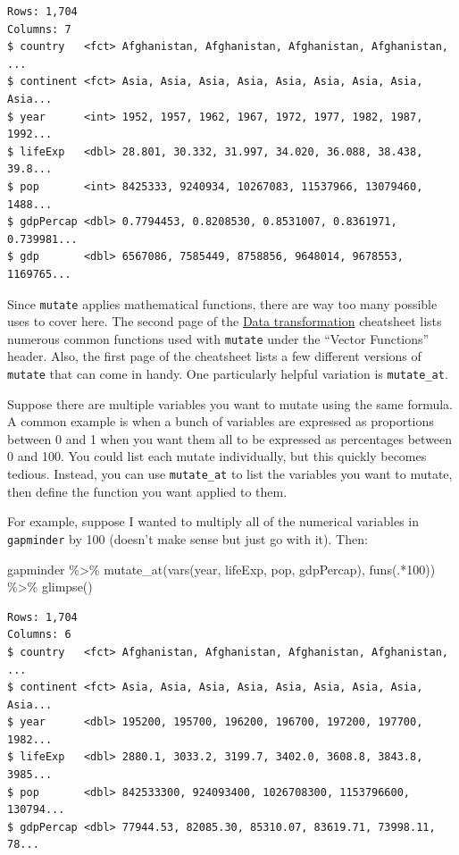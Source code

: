 \documentclass[
]{book}
\makeatletter
\newenvironment{Shaded}{\begin{snugshade}}{\end{snugshade}}
\newcommand{\DecValTok}[1]{\textcolor[rgb]{0.06,0.06,0.06}{#1}}
\newcommand{\FunctionTok}[1]{\textcolor[rgb]{0,0,0}{#1}}
\newcommand{\NormalTok}[1]{#1}
\newcommand{\SpecialCharTok}[1]{\textcolor[rgb]{0,0,0}{#1}}
\newenvironment{kframe}{%
\medskip{}
\setlength{\fboxsep}{.8em}
 \def\at@end@of@kframe{}%
 \ifinner\ifhmode%
  \def\at@end@of@kframe{\end{minipage}}%
  \begin{minipage}{\columnwidth}%
 \fi\fi%
 \def\FrameCommand##1{\hskip\@totalleftmargin \hskip-\fboxsep
 \colorbox{shadecolor}{##1}\hskip-\fboxsep
     \hskip-\linewidth \hskip-\@totalleftmargin \hskip\columnwidth}%
 \MakeFramed {\advance\hsize-\width
   \@totalleftmargin\z@ \linewidth\hsize
   \@setminipage}}%
 {\par\unskip\endMakeFramed%
 \at@end@of@kframe}
\renewenvironment{Shaded}{\begin{kframe}}{\end{kframe}}
\makeatother
\begin{document}
\begin{verbatim}
Rows: 1,704
Columns: 7
$ country   <fct> Afghanistan, Afghanistan, Afghanistan, Afghanistan, ...
$ continent <fct> Asia, Asia, Asia, Asia, Asia, Asia, Asia, Asia, Asia...
$ year      <int> 1952, 1957, 1962, 1967, 1972, 1977, 1982, 1987, 1992...
$ lifeExp   <dbl> 28.801, 30.332, 31.997, 34.020, 36.088, 38.438, 39.8...
$ pop       <int> 8425333, 9240934, 10267083, 11537966, 13079460, 1488...
$ gdpPercap <dbl> 0.7794453, 0.8208530, 0.8531007, 0.8361971, 0.739981...
$ gdp       <dbl> 6567086, 7585449, 8758856, 9648014, 9678553, 1169765...
\end{verbatim}

Since \texttt{mutate} applies mathematical functions, there are way too many possible uses to cover here. The second page of the \href{https://github.com/rstudio/cheatsheets/raw/master/data-transformation.pdf}{Data transformation} cheatsheet lists numerous common functions used with \texttt{mutate} under the ``Vector Functions'' header. Also, the first page of the cheatsheet lists a few different versions of \texttt{mutate} that can come in handy. One particularly helpful variation is \texttt{mutate\_at}.

Suppose there are multiple variables you want to mutate using the same formula. A common example is when a bunch of variables are expressed as proportions between 0 and 1 when you want them all to be expressed as percentages between 0 and 100. You could list each mutate individually, but this quickly becomes tedious. Instead, you can use \texttt{mutate\_at} to list the variables you want to mutate, then define the function you want applied to them.

For example, suppose I wanted to multiply all of the numerical variables in \texttt{gapminder} by 100 (doesn't make sense but just go with it). Then:

\begin{Shaded}
\begin{Highlighting}[]
\NormalTok{gapminder }\SpecialCharTok{\%\textgreater{}\%} 
  \FunctionTok{mutate\_at}\NormalTok{(}\FunctionTok{vars}\NormalTok{(year, lifeExp, pop, gdpPercap), }\FunctionTok{funs}\NormalTok{(.}\SpecialCharTok{*}\DecValTok{100}\NormalTok{)) }\SpecialCharTok{\%\textgreater{}\%} 
  \FunctionTok{glimpse}\NormalTok{()}
\end{Highlighting}
\end{Shaded}

\begin{verbatim}
Rows: 1,704
Columns: 6
$ country   <fct> Afghanistan, Afghanistan, Afghanistan, Afghanistan, ...
$ continent <fct> Asia, Asia, Asia, Asia, Asia, Asia, Asia, Asia, Asia...
$ year      <dbl> 195200, 195700, 196200, 196700, 197200, 197700, 1982...
$ lifeExp   <dbl> 2880.1, 3033.2, 3199.7, 3402.0, 3608.8, 3843.8, 3985...
$ pop       <dbl> 842533300, 924093400, 1026708300, 1153796600, 130794...
$ gdpPercap <dbl> 77944.53, 82085.30, 85310.07, 83619.71, 73998.11, 78...
\end{verbatim}
\end{document}
